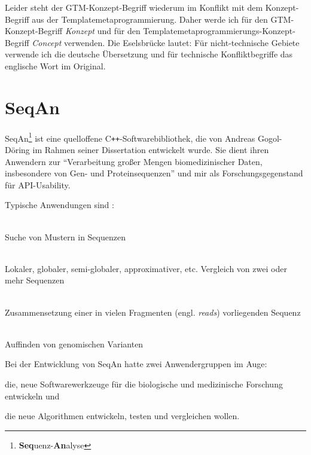 Leider steht der GTM-Konzept-Begriff wiederum im Konflikt mit dem Konzept-Begriff aus der Templatemetaprogrammierung. Daher werde ich für den GTM-Konzept-Begriff \textit{Konzept} und für den Templatemetaprogrammierungs-Konzept-Begriff \textit{Concept} verwenden. Die Eselsbrücke lautet: Für nicht-technische Gebiete verwende ich die deutsche Übersetzung und für technische Konfliktbegriffe das englische Wort im Original.




\section{SeqAn}

SeqAn\footnote{\textbf{Seq}uenz-\textbf{An}alyse} ist eine quelloffene C{}\verb!++!-Softwarebibliothek, die von Andreas Gogol-Döring im Rahmen seiner Dissertation \citep{GogolDoring:2009vz} entwickelt wurde. Sie dient ihren Anwendern zur ``Verarbeitung großer Mengen biomedizinischer Daten, insbesondere von Gen- und Proteinsequenzen'' und mir als Forschungsgegenstand für API-Usability.

\bigskip

Typische Anwendungen sind \citep{Reinert:tg}:
\begin{description}\itemsep1pt\parskip0pt
  \item[Indices] \hfill \\ Suche von Mustern in Sequenzen
  \item[Alignment] \hfill \\ Lokaler, globaler, semi-globaler, approximativer, etc. Vergleich von zwei oder mehr Sequenzen
  \item[Read-Mapping] \hfill \\ Zusammensetzung einer in vielen Fragmenten (engl. \textit{reads}) vorliegenden Sequenz
  \item[Assemblies] \hfill \\ Auffinden von genomischen Varianten
\end{description}

\bigskip

Bei der Entwicklung von SeqAn hatte \cite{GogolDoring:2009vz} zwei Anwendergruppen im Auge:
\begin{description}\itemsep1pt\parskip0pt
  \item[Softwareentwickler,] die, neue Softwarewerkzeuge für die biologische und medizinische Forschung entwickeln und
  \item[Algorithmendesigner,] die neue Algorithmen entwickeln, testen und vergleichen wollen.
\end{description}

